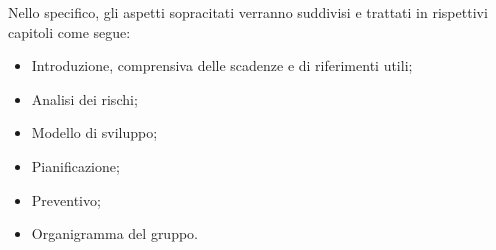 Nello specifico, gli aspetti sopracitati verranno suddivisi e trattati in rispettivi capitoli come segue:
    \begin{itemize}
        \item Introduzione, comprensiva delle scadenze e di riferimenti utili;
        \item Analisi dei rischi;
        \item Modello di sviluppo;
        \item Pianificazione;
        \item Preventivo;
        \item Organigramma del gruppo.
    \end{itemize}